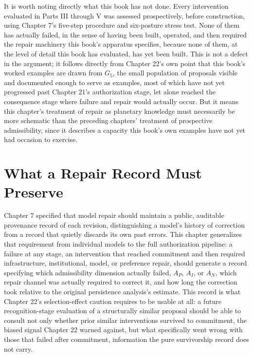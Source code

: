 \documentclass[11pt,oneside]{book}
\begin{document}
It is worth noting directly what this book has not done. Every intervention evaluated in Parts III through V was assessed prospectively, before construction, using Chapter 7's five-step procedure and six-posture stress test. None of them has actually failed, in the sense of having been built, operated, and then required the repair machinery this book's apparatus specifies, because none of them, at the level of detail this book has evaluated, has yet been built. This is not a defect in the argument; it follows directly from Chapter 22's own point that this book's worked examples are drawn from $G_5$, the small population of proposals visible and documented enough to serve as examples, most of which have not yet progressed past Chapter 21's authorization stage, let alone reached the consequence stage where failure and repair would actually occur. But it means this chapter's treatment of repair as planetary knowledge must necessarily be more schematic than the preceding chapters' treatment of prospective admissibility, since it describes a capacity this book's own examples have not yet had occasion to exercise.

\section*{What a Repair Record Must Preserve}

Chapter 7 specified that model repair should maintain a public, auditable provenance record of each revision, distinguishing a model's history of correction from a record that quietly discards its own past errors. This chapter generalizes that requirement from individual models to the full authorization pipeline: a failure at any stage, an intervention that reached commitment and then required infrastructure, institutional, model, or preference repair, should generate a record specifying which admissibility dimension actually failed, $A_P$, $A_I$, or $A_N$, which repair channel was actually required to correct it, and how long the correction took relative to the original persistence analysis's estimate. This record is what Chapter 22's selection-effect caution requires to be usable at all: a future recognition-stage evaluation of a structurally similar proposal should be able to consult not only whether prior similar interventions survived to commitment, the biased signal Chapter 22 warned against, but what specifically went wrong with those that failed after commitment, information the pure survivorship record does not carry.
\end{document}
